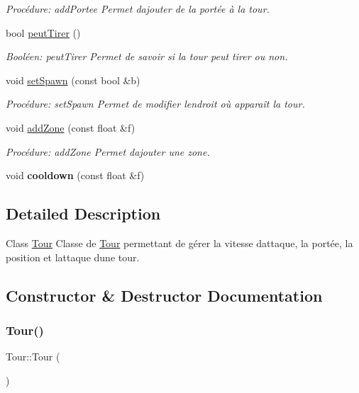 \begin{DoxyCompactItemize}
\begin{DoxyCompactList}\small\item\em Procédure\+: add\+Portee Permet d\textquotesingle{}ajouter de la portée à la tour. \end{DoxyCompactList}\item 
bool \hyperlink{classTour_ab9f95f1a87befc1c47c5904c7dba213e}{peut\+Tirer} ()
\begin{DoxyCompactList}\small\item\em Booléen\+: peut\+Tirer Permet de savoir si la tour peut tirer ou non. \end{DoxyCompactList}\item 
void \hyperlink{classTour_a896b0ab5f8a022d7deb6d599de8d4642}{set\+Spawn} (const bool \&b)
\begin{DoxyCompactList}\small\item\em Procédure\+: set\+Spawn Permet de modifier l\textquotesingle{}endroit où apparaît la tour. \end{DoxyCompactList}\item 
void \hyperlink{classTour_a6c3050640d16281913269f73af884ad6}{add\+Zone} (const float \&f)
\begin{DoxyCompactList}\small\item\em Procédure\+: add\+Zone Permet d\textquotesingle{}ajouter une zone. \end{DoxyCompactList}\item 
\mbox{\label{classTour_a6ba02ec8874bcce13e97837da971f29e}} 
void {\bfseries cooldown} (const float \&f)
\end{DoxyCompactItemize}


\subsection{Detailed Description}
Class \hyperlink{classTour}{Tour} Classe de \hyperlink{classTour}{Tour} permettant de gérer la vitesse d\textquotesingle{}attaque, la portée, la position et l\textquotesingle{}attaque d\textquotesingle{}une tour. 

\subsection{Constructor \& Destructor Documentation}
\mbox{\label{classTour_a85e0f0e2346d1e42a09a80c1cd6d19c4}} 
\subsubsection{\texorpdfstring{Tour()}{Tour()}\hspace{0.1cm}{\footnotesize\ttfamily [1/3]}}
{\footnotesize\ttfamily Tour\+::\+Tour (\begin{DoxyParamCaption}{ }\end{DoxyParamCaption})}



